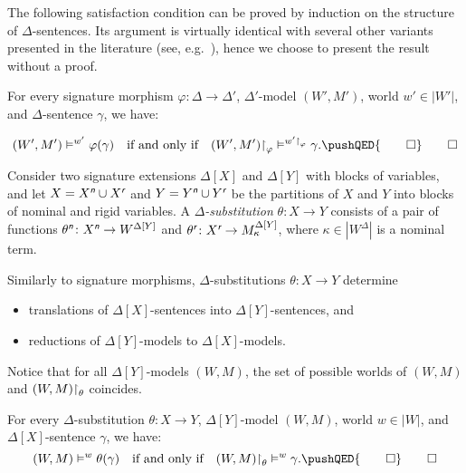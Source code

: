 \documentclass[a4paper,UKenglish,cleveref,autoref]{lipics-v2019}
\begin{document}
The following satisfaction condition can be proved by induction on the structure of $\Delta$-sentences.
Its argument is virtually identical with several other variants presented in the literature (see, e.g.~\cite{Diaconescu16}), hence we choose to present the result without a proof.

\begin{proposition}
  \label{proposition:morph-sat-cond}
  For every signature morphism $\varphi \colon \Delta \to \Delta'$, $\Delta'$-model $(W', M')$, world $w' \in |W'|$, and $\Delta$-sentence $\gamma$, we have:
  \addtocounter{footnote}{-1}
  \[
    (W', M') \models^{w'} \varphi(\gamma)
    \quad\text{if and only if}\quad
    (W', M') \red_{\varphi} \models^{w'\red_\varphi} \gamma.
    \pushQED{\qed}
    \qedhere
  \]
\end{proposition}

Consider two signature extensions $\Delta[X]$ and $\Delta[Y]$ with blocks of variables, and let $X = X^{\text{\normalfont\sffamily\itshape n}} \cup X^{\text{\normalfont\sffamily\itshape r}}$ and $Y = Y^{\text{\normalfont\sffamily\itshape n}} \cup Y^{\text{\normalfont\sffamily\itshape r}}$ be the partitions of $X$ and $Y$ into blocks of nominal and rigid variables.
A \emph{$\Delta$-substitution} $\theta \colon X \to Y$ consists of a pair of functions
$\theta^{\text{\normalfont\sffamily\itshape n}} \colon X^{\text{\normalfont\sffamily\itshape n}} \to W^{\Delta[Y]}$ and
$\theta^{\text{\normalfont\sffamily\itshape r}} \colon X^{\text{\normalfont\sffamily\itshape r}} \to M^{\Delta[Y]}_{\kappa}$, where $\kappa\in |W^\Delta|$ is a nominal term.

Similarly to signature morphisms, $\Delta$-substitutions $\theta \colon X \to Y$ determine 
\begin{itemize}
 \item translations of $\Delta[X]$-sentences into $\Delta[Y]$-sentences, and
 \item reductions of $\Delta[Y]$-models to $\Delta[X]$-models.
 \end{itemize}
 
 Notice that for all $\Delta[Y]$-models $(W,M)$, the set of possible worlds of $(W,M)$ and $(W,M)\mathord{\upharpoonright}_\theta$ coincides.

\begin{proposition}
  \label{proposition:subst-sat-cond}
  For every $\Delta$-substitution $\theta \colon X \to Y$, $\Delta[Y]$-model $(W, M)$, world $w \in |W|$, and $\Delta[X]$-sentence $\gamma$, we have:
  \[
    (W, M) \models^{w} \theta(\gamma)
    \quad\text{if and only if}\quad
    (W, M) \red_{\theta} \models^{w} \gamma.
    \pushQED{\qed}\qedhere
  \]
\end{proposition} 
\end{document}
